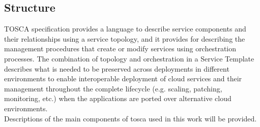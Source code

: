 \subsection*{Structure}
TOSCA specification provides a language to describe service components and their relationships using a service topology, and it provides for describing the management procedures that create or modify services using orchestration processes.
The combination of topology and orchestration in a Service Template describes what is needed to be preserved across deployments in different environments to enable interoperable deployment of cloud services and their management throughout the complete lifecycle (e.g. scaling, patching, monitoring, etc.) when the applications are ported over alternative cloud environments. \cite{TOSCA-v1.0_book} \\
Descriptions of the main components of \gls{tosca} used in this work will be provided.
